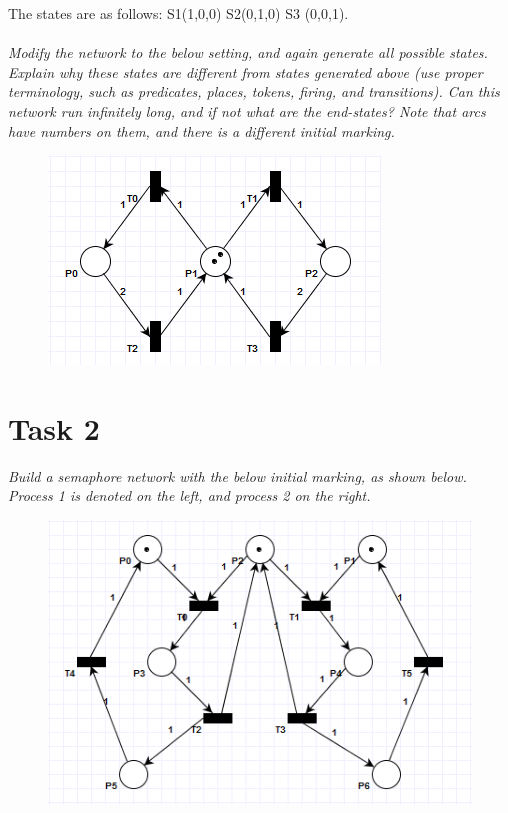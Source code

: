 \documentclass[letterpaper]{article}
\begin{document}
The states are as follows: S1(1,0,0) S2(0,1,0) S3 (0,0,1). \\ \\

\textit{Modify the network to the below setting, and again generate all possible states. Explain why these states are different from states generated above (use proper terminology, such as predicates, places, tokens, firing, and transitions). Can this network run infinitely long, and if not what are the end-states?
 Note that arcs have numbers on them, and there is a different initial marking.
}

\begin{figure}[H]
 \centering
 \includegraphics[width=\textwidth]{image2.png}
\end{figure}

\section{Task 2}

\textit{Build a semaphore network with the below initial marking, as shown below. Process 1 is denoted on the left, and process 2 on the right.
}
\begin{figure}[H]
 \centering
 \includegraphics[width=\textwidth]{image3.png}
\end{figure}
\end{document}
